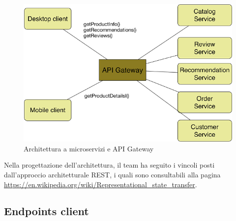 \begin{figure}[h]
	\centering
	\includegraphics[width=\textwidth,height=\textheight,keepaspectratio,scale=0.1]{images/apigateway1.png}
	\caption{Architettura a microservizi e API Gateway}\label{fig:apig1}
\end{figure}
\newpage
Nella progettazione dell'architettura, il team ha seguito i vincoli posti dall'approccio architetturale REST, i quali sono consultabili alla pagina \url{https://en.wikipedia.org/wiki/Representational_state_transfer}.
\subsection{Endpoints client}

